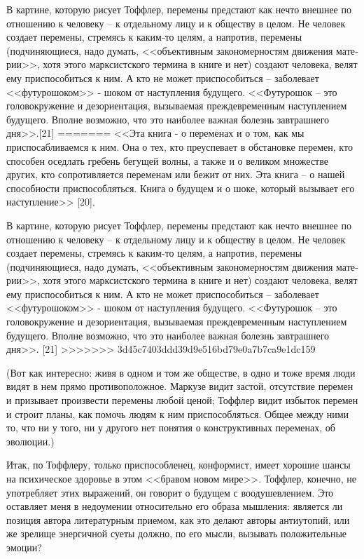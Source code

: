 \documentclass{book}
\begin{document}
{В картине, которую рисует Тоффлер, перемены предстают как нечто внешнее по отношению к человеку -- к отдельному лицу и к обществу в целом. Не человек создает перемены, стре­мясь к каким‑то целям, а напротив, перемены (подчиняющиеся, надо думать, <<объективным закономерностям движения мате­рии>>, хотя этого марксистского термина в книге и нет) созда­ют человека, велят ему приспособиться к ним. А кто не может приспособиться -- заболевает <<футурошоком>> ‑ шоком от на­ступления будущего. <<Футурошок -- это головокружение и де­зориентация, вызываемая преждевременным наступлением буду­щего. Вполне возможно, что это наиболее важная болезнь завт­рашнего дня>>.[21]
=======
<<Эта книга - о переменах и о том, как мы приспосабливаем­ся к ним. Она о тех, кто преуспевает в обстановке перемен, кто способен оседлать гребень бегущей волны, а также и о великом множестве других, кто сопротивляется переменам или бежит от них. Эта книга -- о нашей способности приспособляться. Книга о будущем и о шоке, который вызывает его наступле­ние>> [20].

В картине, которую рисует Тоффлер, перемены предстают как нечто внешнее по отношению к человеку -- к отдельному лицу и к обществу в целом. Не человек создает перемены, стре­мясь к каким-то целям, а напротив, перемены (подчиняющиеся, надо думать, <<объективным закономерностям движения мате­рии>>, хотя этого марксистского термина в книге и нет) созда­ют человека, велят ему приспособиться к ним. А кто не может приспособиться -- заболевает <<футурошоком>> - шоком от на­ступления будущего. <<Футурошок -- это головокружение и де­зориентация, вызываемая преждевременным наступлением буду­щего. Вполне возможно, что это наиболее важная болезнь завт­рашнего дня>>. [21]
>>>>>>> 3d45c7403ddd39d9e516bd79e0a7b7ca9e1dc159

(Вот как интересно: живя в одном и том же обществе, в од­но и тоже время люди видят в нем прямо противоположное. Маркузе видит застой, отсутствие перемен и призывает произ­вести перемены любой ценой; Тоффлер видит избыток пере­мен и строит планы, как помочь людям к ним приспособлять­ся. Общее между ними то, что ни у того, ни у другого нет поня­тия о конструктивных  переменах, об эволюции.)

Итак, по Тоффлеру, только приспособленец, конформист, имеет хорошие шансы на психическое здоровье в этом <<бра­вом новом мире>>. Тоффлер, конечно, не употребляет этих вы­ражений, он говорит о будущем с воодушевлением. Это остав­ляет меня в недоумении относительно его образа мышления: является ли позиция автора литературным приемом, как это делают авторы антиутопий, или же зрелище энергичной суеты должно, по его мысли, вызывать положительные эмоции?

}
\end{document}
